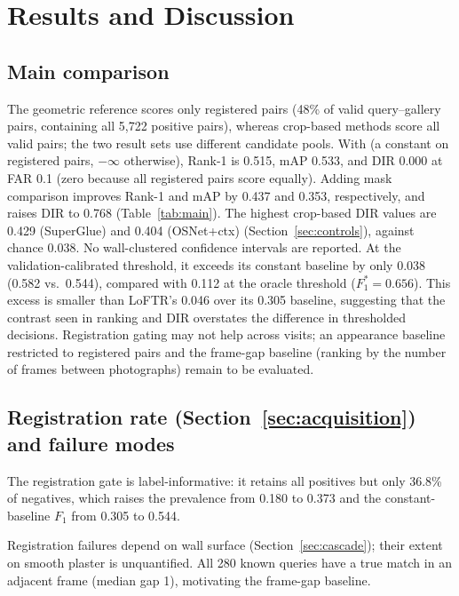 \section{Results and Discussion}
\label{sec:results}

\subsection{Main comparison}

The geometric reference scores only registered pairs (48\% of valid query--gallery pairs, containing all 5,722 positive pairs), whereas crop-based methods score all valid pairs; the two result sets use different candidate pools.
With \regonly{} (a constant on registered pairs, $-\infty$ otherwise), Rank-1 is 0.515, mAP 0.533, and DIR 0.000 at FAR 0.1 (zero because all registered pairs score equally). Adding mask comparison improves Rank-1 and mAP by 0.437 and 0.353, respectively, and raises DIR to 0.768 (Table~\ref{tab:main}). The highest crop-based DIR values are 0.429 (SuperGlue) and 0.404 (OSNet+ctx) (Section~\ref{sec:controls}), against chance 0.038.
No wall-clustered confidence intervals are reported.
At the validation-calibrated threshold, it exceeds its constant baseline by only 0.038 (0.582 vs.\ 0.544), compared with 0.112 at the oracle threshold ($F_1^{*} = 0.656$). This excess is smaller than LoFTR's 0.046 over its 0.305 baseline, suggesting that the contrast seen in ranking and DIR overstates the difference in thresholded decisions.
Registration gating may not help across visits; an appearance baseline restricted to registered pairs and the frame-gap baseline (ranking by the number of frames between photographs) remain to be evaluated.

\subsection{Registration rate (Section~\ref{sec:acquisition}) and failure modes}
\label{sec:coverage}
\label{sec:chamferablation}

The registration gate is label-informative: it retains all positives but only 36.8\% of negatives, which raises the prevalence from 0.180 to 0.373 and the constant-baseline $F_1$ from 0.305 to 0.544.

Registration failures depend on wall surface (Section~\ref{sec:cascade}); their extent on smooth plaster is unquantified. All 280 known queries have a true match in an adjacent frame (median gap 1), motivating the frame-gap baseline.

